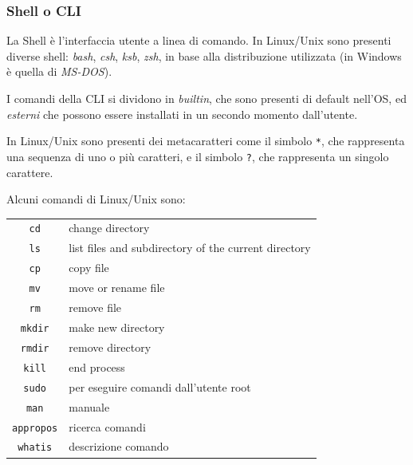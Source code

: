 \documentclass{article}
\begin{document}
\subsubsection*{Shell o CLI}
La Shell è l'interfaccia utente a linea di comando. In Linux/Unix sono presenti diverse shell: \textit{bash}, \textit{csh},
\textit{ksb}, \textit{zsh}, in base alla distribuzione utilizzata (in Windows è quella di \textit{MS-DOS}).

I comandi della CLI si dividono in \textit{builtin}, che sono presenti di default nell'OS, ed \textit{esterni} che possono
essere installati in un secondo momento dall'utente.

In Linux/Unix sono presenti dei metacaratteri come il simbolo \verb|*|, che rappresenta una sequenza di uno o più caratteri,
e il simbolo \verb|?|, che rappresenta un singolo carattere.

Alcuni comandi di Linux/Unix sono:
\begin{center}
	\begin{tabularx}{\textwidth}{c X}
		\verb|cd| & change directory \\
		\verb|ls| & list files and subdirectory of the current directory \\
		\verb|cp| & copy file \\
		\verb|mv| & move or rename file \\
		\verb|rm| & remove file\\
		\verb|mkdir| & make new directory \\
		\verb|rmdir| & remove directory \\
		\verb|kill| & end process \\
		\verb|sudo| & per eseguire comandi dall'utente root \\
		\verb|man| & manuale \\
		\verb|appropos| & ricerca comandi \\
		\verb|whatis| & descrizione comando
	\end{tabularx}
\end{center}

\newpage


\end{document}
